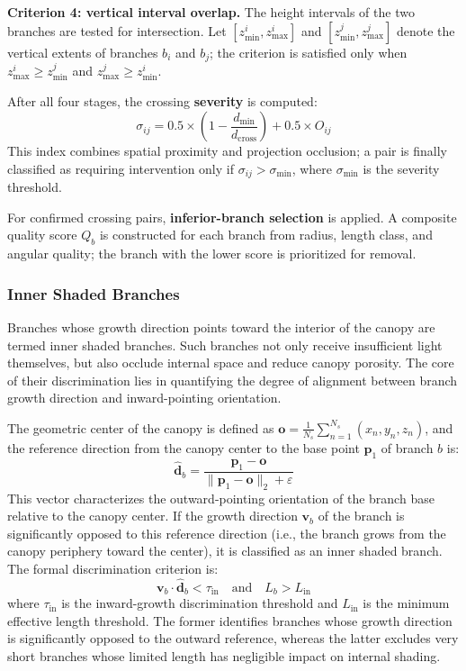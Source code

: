 \documentclass[12pt,a4paper,fontset=fandol]{ctexart}
\newcommand{\vb}[1][b]{\mathbf{v}_{#1}}
\begin{document}
\textbf{Criterion 4: vertical interval overlap.}
The height intervals of the two branches are tested for intersection.
Let $[z_{\min}^i, z_{\max}^i]$ and $[z_{\min}^j, z_{\max}^j]$ denote the vertical extents of branches $b_i$ and $b_j$;
the criterion is satisfied only when $z_{\max}^i \geq z_{\min}^j$ and $z_{\max}^j \geq z_{\min}^i$.

After all four stages, the crossing \textbf{severity} is computed:
\begin{equation}\label{eq:severity}
  \sigma_{ij} = 0.5 \times \left(1 - \frac{d_{\min}}{d_{\text{cross}}}\right) + 0.5 \times O_{ij}
\end{equation}
This index combines spatial proximity and projection occlusion;
a pair is finally classified as requiring intervention only if $\sigma_{ij} > \sigma_{\min}$,
where $\sigma_{\min}$ is the severity threshold.

For confirmed crossing pairs, \textbf{inferior-branch selection} is applied.
A composite quality score $Q_b$ is constructed for each branch from radius, length class, and angular quality;
the branch with the lower score is prioritized for removal.

\subsubsection{Inner Shaded Branches}

Branches whose growth direction points toward the interior of the canopy are termed inner shaded branches.
Such branches not only receive insufficient light themselves,
but also occlude internal space and reduce canopy porosity.
The core of their discrimination lies in quantifying the degree of alignment between branch growth direction and inward-pointing orientation.

The geometric center of the canopy is defined as $\mathbf{o} = \frac{1}{N_s}\sum_{n=1}^{N_s}(x_n, y_n, z_n)$,
and the reference direction from the canopy center to the base point $\mathbf{p}_1$ of branch $b$ is:
\begin{equation}\label{eq:inward_ref}
  \hat{\mathbf{d}}_b = \frac{\mathbf{p}_1 - \mathbf{o}}{\|\mathbf{p}_1 - \mathbf{o}\|_2 + \varepsilon}
\end{equation}
This vector characterizes the outward-pointing orientation of the branch base relative to the canopy center.
If the growth direction $\vb$ of the branch is significantly opposed to this reference direction
(i.e., the branch grows from the canopy periphery toward the center), it is classified as an inner shaded branch.
The formal discrimination criterion is:
\begin{equation}\label{eq:inward}
  \vb \cdot \hat{\mathbf{d}}_b < \tau_{\text{in}} \quad \text{and} \quad L_b > L_{\text{in}}
\end{equation}
where $\tau_{\text{in}}$ is the inward-growth discrimination threshold and $L_{\text{in}}$ is the minimum effective length threshold.
The former identifies branches whose growth direction is significantly opposed to the outward reference,
whereas the latter excludes very short branches whose limited length has negligible impact on internal shading.
\end{document}
